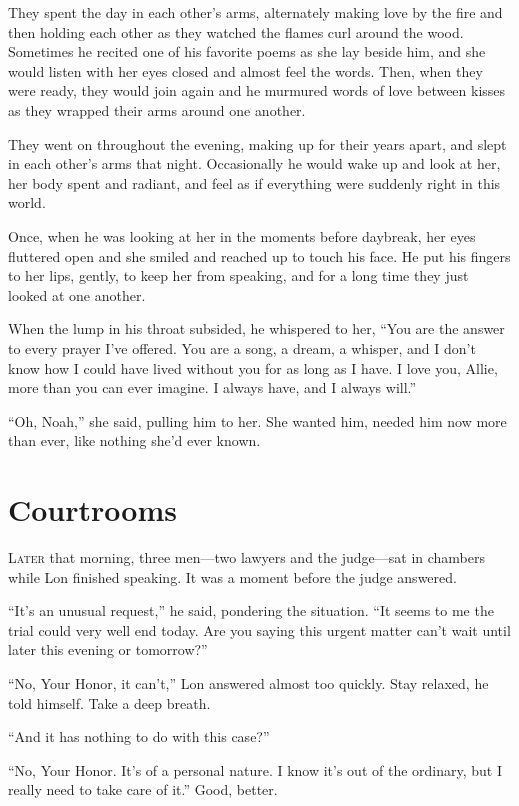 \documentclass[10pt, twoside, openright]{book}
\newcommand{\chapterornament}[1]{\def\currentornament{#1}}
\def\currentornament{}
\begin{document}
They spent the day in each other's arms, alternately making love by the
fire and then holding each other as they watched the flames curl around
the wood. Sometimes he recited one of his favorite poems as she lay
beside him, and she would listen with her eyes closed and almost feel
the words. Then, when they were ready, they would join again and he
murmured words of love between kisses as they wrapped their arms around
one another.

They went on throughout the evening, making up for their years apart,
and slept in each other's arms that night. Occasionally he would wake up
and look at her, her body spent and radiant, and feel as if everything
were suddenly right in this world.

Once, when he was looking at her in the moments before daybreak, her
eyes fluttered open and she smiled and reached up to touch his face. He
put his fingers to her lips, gently, to keep her from speaking, and for
a long time they just looked at one another.

When the lump in his throat subsided, he whispered to her, ``You are the
answer to every prayer I've offered. You are a song, a dream, a whisper,
and I don't know how I could have lived without you for as long as I
have. I love you, Allie, more than you can ever imagine. I always have,
and I always will.''

``Oh, Noah,'' she said, pulling him to her. She wanted him, needed him
now more than ever, like nothing she'd ever known.

		\newpage
\thispagestyle{empty}
\clearpage
\null
\chapterornament{89}
\chapter{Courtrooms}

\lettrine[findent=0.5em, nindent=0.0em]{L}{ater} that morning, three men---two lawyers and the judge---sat in
chambers while Lon finished speaking. It was a moment before the judge
answered.

``It's an unusual request,'' he said, pondering the situation. ``It
seems to me the trial could very well end today. Are you saying this
urgent matter can't wait until later this evening or tomorrow?''

``No, Your Honor, it can't,'' Lon answered almost too quickly. Stay
relaxed, he told himself. Take a deep breath.


``And it has nothing to do with this case?''


``No, Your Honor. It's of a personal nature. I know it's out of the
ordinary, but I really need to take care of it.'' Good, better.
\end{document}
